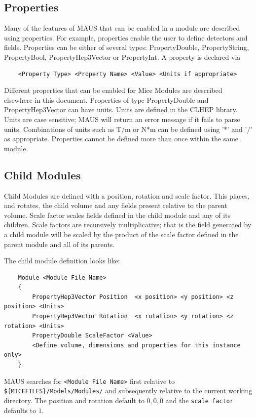 \subsection{Properties}
Many of the features of MAUS that can be enabled in a module are described using properties. For example, properties
enable the user to define detectors and fields. Properties can be either of several types: PropertyDouble,
PropertyString, PropertyBool, PropertyHep3Vector or PropertyInt. A property is declared via
\begin{verbatim}
    <Property Type> <Property Name> <Value> <Units if appropriate>
\end{verbatim}
Different properties that can be enabled for Mice Modules are described elsewhere in this document. Properties of type
PropertyDouble and PropertyHep3Vector can have units. Units are defined in the CLHEP library. Units are case sensitive;
MAUS will return an error message if it fails to parse units. Combinations of units such as T/m or N*m can be defined
using '*' and '/' as appropriate. Properties cannot be defined more than once within the same module.

\subsection{Child Modules}
Child Modules are defined with a position, rotation and scale factor. This places, and rotates, the child volume and any
fields present relative to the parent volume. Scale factor scales fields defined in the child module and any of its
children. Scale factors are recursively multiplicative; that is the field generated by a child module will be scaled by
the product of the scale factor defined in the parent module and all of its parents.

The child module definition looks like:
\begin{verbatim}
    Module <Module File Name>
    {
        PropertyHep3Vector Position  <x position> <y position> <z position> <Units>
        PropertyHep3Vector Rotation  <x rotation> <y rotation> <z rotation> <Units>
        PropertyDouble ScaleFactor <Value>
        <Define volume, dimensions and properties for this instance only>
    }
\end{verbatim}
MAUS searches for \verb|<Module File Name>| first relative to \verb|${MICEFILES}/Models/Modules/| and subsequently
relative to the current working directory. The position and rotation default to $0, 0, 0$ and the \verb|scale factor| defaults
to $1$.

